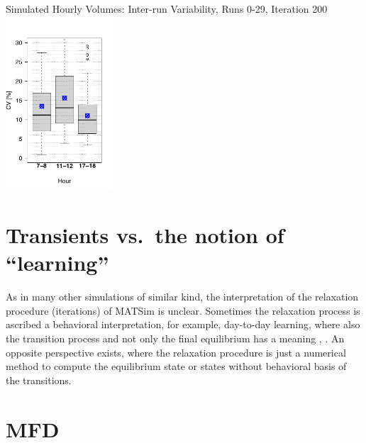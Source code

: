 {	{\label{fig:linkVolumesHour17-18InterScatter}}%
  {}%
	\createsubfigure%
  {Simulated Hourly Volumes: Inter-run Variability, Runs 0-29, Iteration 200}%
	{\includegraphics[width=0.3\textwidth]{understanding/figures/var/linkVolumesInter200.pdf}}%
	{\label{fig:linkVolumesInter200}}%
  {}%
}%
{} 

\vfill\eject
\section{Transients vs.\ the notion of ``learning''}
\label{sec:transients-vs-learning}

As in many other simulations of similar kind, the interpretation of the relaxation procedure (iterations) of MATSim is unclear. 
%
Sometimes the relaxation process is ascribed a behavioral interpretation, for example, day-to-day learning, where also the transition process and not only the final equilibrium has a meaning \citep[][p.128]{LiuEtAl_TransResA_2006}, \citep[][p.523]{NagelBarrett_IJMPC_1997}. 
%
An opposite perspective exists, where the relaxation procedure is just a numerical method to compute the equilibrium state or states without behavioral basis of the transitions.


\vfill\eject
\section{MFD}
\label{sec:researchavenues-mfd}


\vfill\eject
